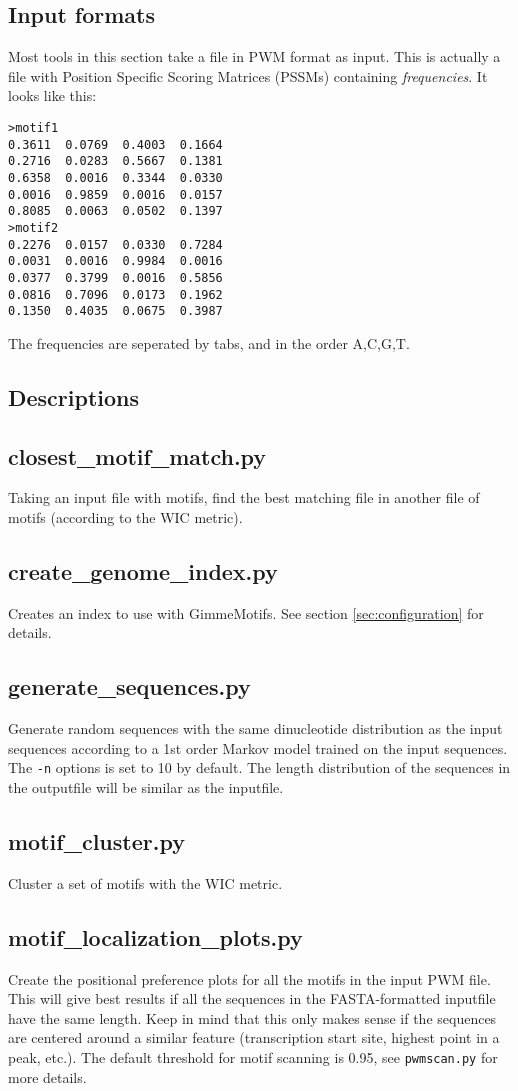 \documentclass[11pt]{article}
\begin{document}
\subsection{Input formats}
Most tools in this section take a file in PWM format as input. This is actually a file with Position Specific Scoring Matrices (PSSMs) containing \emph{frequencies}. It looks like this:
\begin{verbatim}
>motif1
0.3611	0.0769	0.4003	0.1664
0.2716	0.0283	0.5667	0.1381
0.6358	0.0016	0.3344	0.0330
0.0016	0.9859	0.0016	0.0157
0.8085	0.0063	0.0502	0.1397
>motif2
0.2276	0.0157	0.0330	0.7284
0.0031	0.0016	0.9984	0.0016
0.0377	0.3799	0.0016	0.5856
0.0816	0.7096	0.0173	0.1962
0.1350	0.4035	0.0675	0.3987
\end{verbatim}
The frequencies are seperated by tabs, and in the order A,C,G,T.

\subsection{Descriptions}
\subsection*{closest\_motif\_match.py}
Taking an input file with motifs, find the best matching file in another file of motifs (according to the WIC metric).

\subsection*{create\_genome\_index.py}
Creates an index to use with GimmeMotifs. See section \ref{sec:configuration} for details.

\subsection*{generate\_sequences.py}
Generate random sequences with the same dinucleotide distribution as the input sequences according to a 1st order Markov model trained on the input sequences. The \texttt{-n} options is set to 10 by default. The length distribution of the sequences in the outputfile will be similar as the inputfile.

\subsection*{motif\_cluster.py}
Cluster a set of motifs with the WIC metric.

\subsection*{motif\_localization\_plots.py}
Create the positional preference plots for all the motifs in the input PWM file. This will give best results if all the sequences in the FASTA-formatted inputfile have the same length. Keep in mind that this only makes sense if the sequences are centered around a similar feature (transcription start site, highest point in a peak, etc.). The default threshold for motif scanning is 0.95, see \texttt{pwmscan.py} for more details.
\end{document}
